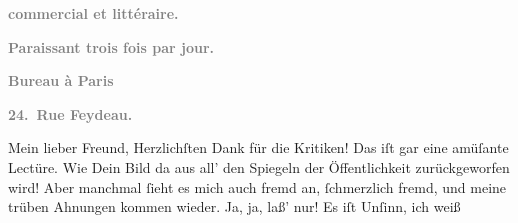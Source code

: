 \pstart
           \begin{otherlanguage}{french}\textcolor{gray}{\textbf{commercial et littéraire.}}\end{otherlanguage}\pend
           
\pstart
           \begin{otherlanguage}{french}\textcolor{gray}{\textbf{\textbf{Paraissant trois fois par jour.}}}\end{otherlanguage}\pend
           
\pstart
           \begin{otherlanguage}{french}\textcolor{gray}{\textbf{\textbf{Bureau à Paris}}}\end{otherlanguage}\pend
           
\pstart
           \begin{otherlanguage}{french}\textcolor{gray}{\textbf{\textbf{24. Rue Feydeau.}}}\end{otherlanguage}\pend
           
\pstart\center{}Mein lieber Freund,\pend\vspace{0.5em}
\pstart
           Herzlichſten Dank für die Kritiken! Das iſt gar eine amüſante Lectüre. Wie  Dein Bild da aus 
               all’ den Spiegeln der Öffentlichkeit zurückgeworfen wird! Aber manchmal{ }ſieht es mich
               auch fremd an,{ }ſchmerzlich fremd, und meine trüben Ahnungen kommen wieder. Ja, ja,
               laß’ nur! Es iſt Unſinn, ich weiß{\dotsfive}\pend
           
